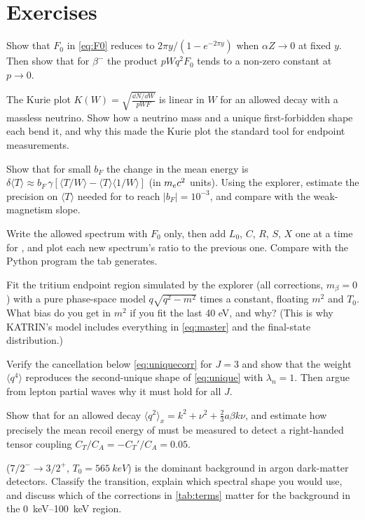 \section{Exercises}
\begin{exercise}[A]
Show that $F_0$ in \cref{eq:F0} reduces to $2\pi y/(1-e^{-2\pi y})$ when $\alpha Z\to0$ at fixed $y$. Then show that for $\beta^-$ the product $pWq^2F_0$ tends to a non-zero constant at $p\to0$.
\end{exercise}
\begin{exercise}[A]
The Kurie plot $K(W) = \sqrt{\frac{\dd N/\dd W}{pWF}}$ is linear in $W$ for an allowed decay with a massless neutrino. Show how a neutrino mass and a unique first-forbidden shape each bend it, and why this made the Kurie plot the standard tool for endpoint measurements.
\end{exercise}
\begin{exercise}[A]
Show that for small $b_F$ the change in the mean energy is $\delta\langle T\rangle \approx b_F\,\gamma\left[\langle T/W\rangle - \langle T\rangle\langle 1/W\rangle\right]$ (in $m_e c^2$ units). Using the explorer, estimate the precision on $\langle T\rangle$ needed for  to reach $|b_F| = 10^{-3}$, and compare with the weak-magnetism slope.
\end{exercise}
\begin{exercise}[P]
Write the allowed spectrum with $F_0$ only, then add $L_0$, $C$, $R$, $S$, $X$ one at a time for , and plot each new spectrum's ratio to the previous one. Compare with the Python program the tab generates.
\end{exercise}
\begin{exercise}[P]
Fit the tritium endpoint region simulated by the explorer (all corrections, $m_\beta = 0$) with a pure phase-space model $q\sqrt{q^2-m^2}$ times a constant, floating $m^2$ and $T_0$. What bias do you get in $m^2$ if you fit the last 40 eV, and why? (This is why KATRIN's model includes everything in \cref{eq:master} and the final-state distribution.)
\end{exercise}
\begin{exercise}[A]
Verify the cancellation below \cref{eq:uniquecorr} for $J = 3$ and show that the weight $\langle q^4\rangle$ reproduces the second-unique shape of \cref{eq:unique} with $\lambda_n = 1$. Then argue from lepton partial waves why it must hold for all $J$.
\end{exercise}
\begin{exercise}[A]
Show that for an allowed decay $\langle q^2\rangle_x = k^2 + \nu^2 + \tfrac23 a\beta k\nu$, and estimate how precisely the mean recoil energy of  must be measured to detect a right-handed tensor coupling $C_T/C_A = -C_T'/C_A = 0.05$.
\end{exercise}
\begin{exercise}[R]
 ($7/2^-\to3/2^+$, $T_0 = \SI{565}{keV}$) is the dominant background in argon dark-matter detectors. Classify the transition, explain which spectral shape you would use, and discuss which of the corrections in \cref{tab:terms} matter for the background in the \SIrange{0}{100}{keV} region.
\end{exercise}

